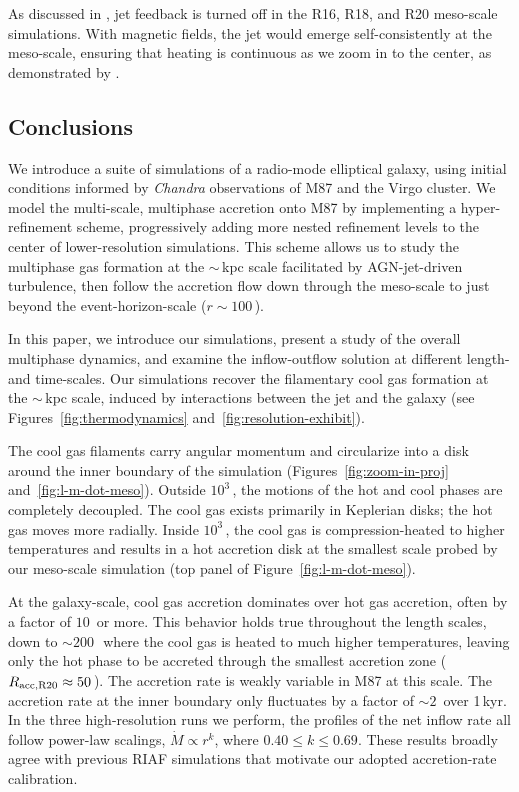 As discussed in , jet feedback is turned off in the R16, R18, and R20 meso-scale simulations.
With magnetic fields, the jet would emerge self-consistently at the meso-scale, ensuring that heating is continuous as we zoom in to the center, as demonstrated by \citet{guo_magnetized_2024}.


\subsection{Conclusions} \label{sec:conclusion}

We introduce a suite of simulations of a radio-mode elliptical galaxy, using initial conditions informed by \textit{Chandra} observations of M87 and the Virgo cluster.
We model the multi-scale, multiphase accretion onto M87 by implementing a hyper-refinement scheme, progressively adding more nested refinement levels to the center of lower-resolution simulations.
This scheme allows us to study the multiphase gas formation at the $\sim$\,kpc scale facilitated by AGN-jet-driven turbulence, then follow the accretion flow down through the meso-scale to just beyond the event-horizon-scale ($r\sim 100$\,\rg).

In this paper, we introduce our simulations, present a study of the overall multiphase dynamics, and examine the inflow-outflow solution at different length- and time-scales.
Our simulations recover the filamentary cool gas formation at the $\sim$\,kpc scale, induced by interactions between the jet and the galaxy (see Figures~\ref{fig:thermodynamics} and~\ref{fig:resolution-exhibit}).

The cool gas filaments carry angular momentum and circularize into a disk around the inner boundary of the simulation (Figures~\ref{fig:zoom-in-proj} and~\ref{fig:l-m-dot-meso}).
Outside $10^3$\,\rg, the motions of the hot and cool phases are completely decoupled. The cool gas exists primarily in Keplerian disks; the hot gas moves more radially. Inside $10^3$\,\rg, the cool gas is compression-heated to higher temperatures and results in a hot accretion disk at the smallest scale probed by our meso-scale simulation (top panel of Figure~\ref{fig:l-m-dot-meso}).

At the galaxy-scale, cool gas accretion dominates over hot gas accretion, often by a factor of $10$\ or more.
This behavior holds true throughout the length scales, down to $\sim 200$\,\rg\ where the cool gas is heated to much higher temperatures, leaving only the hot phase to be accreted through the smallest accretion zone ($R_{\rm acc,R20} \approx 50$\,\rg). The accretion rate is weakly variable in M87 at this scale. The accretion rate at the inner boundary only fluctuates by a factor of $\sim 2$\ over 1\,kyr. In the three high-resolution runs we perform, the profiles of the net inflow rate all follow power-law scalings, $\dot{M} \propto r^k$, where $0.40 \leq k \leq 0.69$. These results broadly agree with previous RIAF simulations that motivate our adopted accretion-rate calibration.

